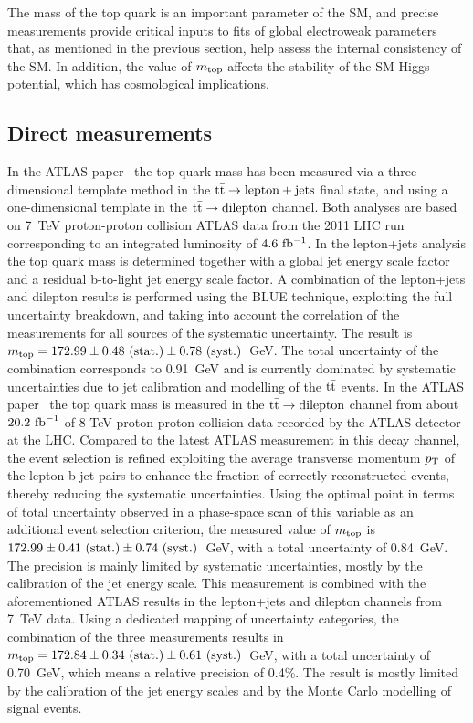 \documentclass{blois}
\begin{document}
The mass of the top quark is an important parameter of the SM, and precise
measurements provide critical inputs to fits of global electroweak parameters
that, as mentioned in the previous section, help assess the internal consistency
of the SM. In addition, the value of $m_{\rm top}$ affects the stability of the
SM Higgs potential, which has cosmological implications.


\subsection{Direct measurements}

In the ATLAS paper~\cite{bib:ATLAS-topMass7TeV} the top quark mass has been
measured via a three-dimensional template method in the ${\rm t{\bar t}\to \rm lepton+jets}$
final state, and using a one-dimensional template in the ${\rm t{\bar t}\to dilepton}$
channel. Both analyses are based on 7~TeV proton-proton collision ATLAS data from
the 2011 LHC run corresponding to an integrated luminosity of $4.6~{\rm fb^{-1}}$.
In the lepton+jets analysis the top quark mass is determined together with a global
jet energy scale factor and a residual b-to-light jet energy scale factor. A
combination of the lepton+jets and dilepton results is performed using the BLUE
technique, exploiting the full uncertainty breakdown, and taking into account the
correlation of the measurements for all sources of the systematic uncertainty.
The result is $m_{\rm top} = 172.99 \pm 0.48~({\rm stat.}) \pm 0.78~({\rm syst.})$~GeV.
The total uncertainty of the combination corresponds to 0.91~GeV and is currently
dominated by systematic uncertainties due to jet calibration and modelling of the
${\rm t{\bar t}}$ events. In the ATLAS paper~\cite{bib:ATLAS-topMassDilepton8TeV}
the top quark mass is measured in the ${\rm t{\bar t}\to dilepton}$ channel from
about $20.2~{\rm fb}^{-1}$ of 8 TeV proton-proton collision data recorded by the
ATLAS detector at the LHC. Compared to the latest ATLAS measurement in this decay
channel, the event selection is refined exploiting the average transverse
momentum $p_{\rm T}$ of the lepton-b-jet pairs to enhance the fraction of
correctly reconstructed events, thereby reducing the systematic uncertainties.
Using the optimal point in terms of total uncertainty observed in a phase-space
scan of this variable as an additional event selection criterion, the measured
value of $m_{\rm top}$ is $172.99\pm 0.41~({\rm stat.})\pm 0.74~({\rm syst.})$~GeV,
with a total uncertainty of 0.84~GeV. The precision is mainly limited by systematic
uncertainties, mostly by the calibration of the jet energy scale. This measurement
is combined with the aforementioned ATLAS results in the lepton+jets and dilepton
channels from 7~TeV data. Using a dedicated mapping of uncertainty categories, the
combination of the three measurements results in
$m_{\rm top} = 172.84 \pm 0.34~({\rm stat.}) \pm 0.61~({\rm syst.})$~GeV, with a
total uncertainty of 0.70~GeV, which means a relative precision of 0.4\%. The
result is mostly limited by the calibration of the jet energy scales and by the
Monte Carlo modelling of signal events.
\end{document}
